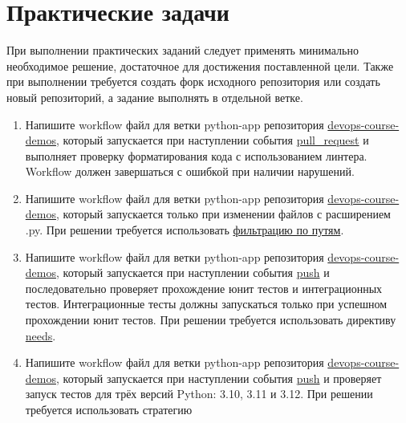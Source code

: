 \documentclass[12pt,a4paper]{article}
\begin{document}
\section{Практические задачи}
При выполнении практических заданий следует применять минимально необходимое решение, достаточное для достижения поставленной цели.
Также при выполнении требуется создать форк исходного репозитория или создать новый репозиторий, а задание выполнять в отдельной ветке.
\begin{enumerate}
    \item Напишите workflow файл для ветки python-app репозитория \href{https://github.com/prafdin/devops-course-demos}{devops-course-demos},
    который запускается при наступлении события
    \href{https://docs.github.com/en/actions/reference/workflows-and-actions/events-that-trigger-workflows#pull\_request}{pull\_request}
    и выполняет проверку форматирования кода с использованием линтера. Workflow должен завершаться с ошибкой при наличии нарушений.
    \item Напишите workflow файл для ветки python-app репозитория \href{https://github.com/prafdin/devops-course-demos}{devops-course-demos}, который запускается только при изменении файлов с расширением .py.
    При решении требуется использовать
    \href{https://docs.github.com/en/actions/reference/workflows-and-actions/workflow-syntax#onpushpull\_requestpull\_request\_targetpathspaths-ignore}{фильтрацию по путям}.
    \item Напишите workflow файл для ветки python-app репозитория \href{https://github.com/prafdin/devops-course-demos}{devops-course-demos},
    который запускается при наступлении события
    \href{https://docs.github.com/en/actions/reference/workflows-and-actions/events-that-trigger-workflows#push}{push} и
    последовательно проверяет прохождение юнит тестов и интеграционных тестов. Интеграционные тесты должны запускаться только
    при успешном прохождении юнит тестов. При решении требуется использовать директиву
    \href{https://docs.github.com/en/actions/reference/workflows-and-actions/workflow-syntax#jobsjob_idneeds}{needs}.
    \item Напишите workflow файл для ветки python-app репозитория \href{https://github.com/prafdin/devops-course-demos}{devops-course-demos},
    который запускается при наступлении события
    \href{https://docs.github.com/en/actions/reference/workflows-and-actions/events-that-trigger-workflows#push}{push} и
    проверяет запуск тестов для трёх версий Python: 3.10, 3.11 и 3.12. При решении требуется использовать стратегию

\end{enumerate}
\end{document}
